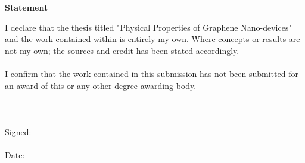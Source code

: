 %


\thispagestyle{plain}
\begin{center}
	\Large
	\textbf{Statement}
\end{center}
	I declare that the thesis titled "Physical Properties of Graphene Nano-devices" and the work contained within is entirely my own. Where concepts or results are not my own; the sources and credit has been stated accordingly.
	\\
	\\
	I confirm that the work contained in this submission has not been submitted for an award of this or any other degree awarding body.
	\\
	\\
	\\
	\\
	Signed:
	\\
	\\
	Date:
%
